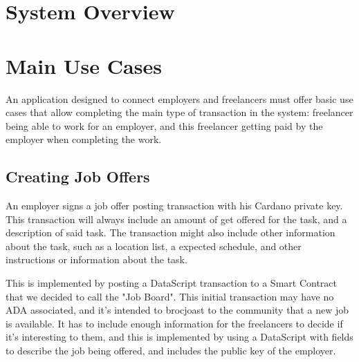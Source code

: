 \documentclass{article}
\begin{document}
\section{System Overview}

 
\section{Main Use Cases}
An application designed to connect employers and freelancers must offer basic use cases that allow completing the main type of transaction in the system: freelancer being able to work for an employer, and this freelancer getting paid by the employer when completing the work.

\subsection{Creating Job Offers}
An employer signs a job offer posting transaction with his Cardano private key. This transaction will always include an amount of get offered for the task, and a description of said task. The transaction might also include other information about the task, such as a location list, a expected schedule, and other instructions or information about the task.

This is implemented by posting a DataScript transaction to a Smart Contract that we decided to call the "Job Board". This initial transaction may have no ADA associated, and it's intended to brocjoast to the community that a new job is available. It has to include enough information for the freelancers to decide if it's interesting to them, and this is implemented by using a DataScript with fields to describe the job being offered, and includes the public key of the employer.
\end{document}
